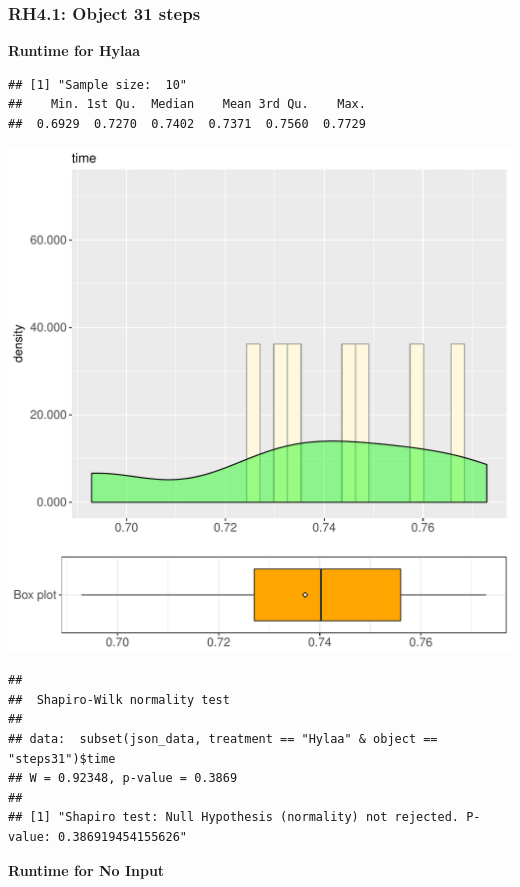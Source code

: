 \documentclass{article}\usepackage[]{graphicx}\usepackage[]{color}
\makeatletter
\def\maxwidth{ %
  \ifdim\Gin@nat@width>\linewidth
    \linewidth
  \else
    \Gin@nat@width
  \fi
}
\newenvironment{kframe}{%
 \def\at@end@of@kframe{}%
 \ifinner\ifhmode%
  \def\at@end@of@kframe{\end{minipage}}%
  \begin{minipage}{\columnwidth}%
 \fi\fi%
 \def\FrameCommand##1{\hskip\@totalleftmargin \hskip-\fboxsep
 \colorbox{shadecolor}{##1}\hskip-\fboxsep
     \hskip-\linewidth \hskip-\@totalleftmargin \hskip\columnwidth}%
 \MakeFramed {\advance\hsize-\width
   \@totalleftmargin\z@ \linewidth\hsize
   \@setminipage}}%
 {\par\unskip\endMakeFramed%
 \at@end@of@kframe}
\newenvironment{knitrout}{}{} %
\makeatother
\begin{document}
\subsubsection{RH4.1: Object 31 steps}

 \textbf{Runtime for Hylaa}
\begin{knitrout}
\color{fgcolor}\begin{kframe}
\begin{verbatim}
## [1] "Sample size:  10"
##    Min. 1st Qu.  Median    Mean 3rd Qu.    Max. 
##  0.6929  0.7270  0.7402  0.7371  0.7560  0.7729
\end{verbatim}
\end{kframe}
\includegraphics[width=\maxwidth]{figure/RH4_Hylaa_steps31-1} 
\begin{kframe}\begin{verbatim}
## 
## 	Shapiro-Wilk normality test
## 
## data:  subset(json_data, treatment == "Hylaa" & object == "steps31")$time
## W = 0.92348, p-value = 0.3869
## 
## [1] "Shapiro test: Null Hypothesis (normality) not rejected. P-value: 0.386919454155626"
\end{verbatim}
\end{kframe}
\end{knitrout}
 \textbf{Runtime for No Input}
\end{document}
